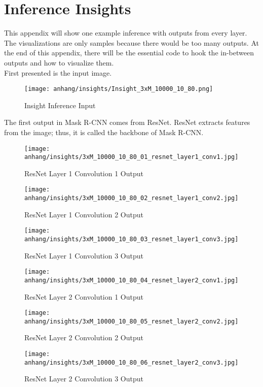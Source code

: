 \chapter{Inference Insights}
\label{appendix:inference-insights}

	This appendix will show one example inference with outputs from every layer. The visualizations are only samples because there would be too many outputs. At the end of this appendix, there will be the essential code to hook the in-between outputs and how to visualize them.\\
	First presented is the input image.
	
	\begin{figure}[H]
		\centering
		\texttt{[image: anhang/insights/Insight\_3xM\_10000\_10\_80.png]}
		\caption[Insight Inference Input]{Insight Inference Input}
	\end{figure}
	\FloatBarrier
	
	\clearpage
	The first output in Mask R-CNN comes from ResNet. ResNet extracts features from the image; thus, it is called the backbone of Mask R-CNN.
	
	\begin{figure}[H]
		\centering
		\texttt{[image: anhang/insights/3xM\_10000\_10\_80\_01\_resnet\_layer1\_conv1.jpg]}
		\caption[ResNet Layer 1 Convolution 1 Output]{ResNet Layer 1 Convolution 1 Output}
	\end{figure}
	\begin{figure}[H]
		\centering
		\texttt{[image: anhang/insights/3xM\_10000\_10\_80\_02\_resnet\_layer1\_conv2.jpg]}
		\caption[ResNet Layer 1 Convolution 2 Output]{ResNet Layer 1 Convolution 2 Output}
	\end{figure}
	\begin{figure}[H]
		\centering
		\texttt{[image: anhang/insights/3xM\_10000\_10\_80\_03\_resnet\_layer1\_conv3.jpg]}
		\caption[ResNet Layer 1 Convolution 3 Output]{ResNet Layer 1 Convolution 3 Output}
	\end{figure}
	
	
	\begin{figure}[H]
		\centering
		\texttt{[image: anhang/insights/3xM\_10000\_10\_80\_04\_resnet\_layer2\_conv1.jpg]}
		\caption[ResNet Layer 2 Convolution 1 Output]{ResNet Layer 2 Convolution 1 Output}
	\end{figure}
	\begin{figure}[H]
		\centering
		\texttt{[image: anhang/insights/3xM\_10000\_10\_80\_05\_resnet\_layer2\_conv2.jpg]}
		\caption[ResNet Layer 2 Convolution 2 Output]{ResNet Layer 2 Convolution 2 Output}
	\end{figure}
	\begin{figure}[H]
		\centering
		\texttt{[image: anhang/insights/3xM\_10000\_10\_80\_06\_resnet\_layer2\_conv3.jpg]}
		\caption[ResNet Layer 2 Convolution 3 Output]{ResNet Layer 2 Convolution 3 Output}
	\end{figure}
	
